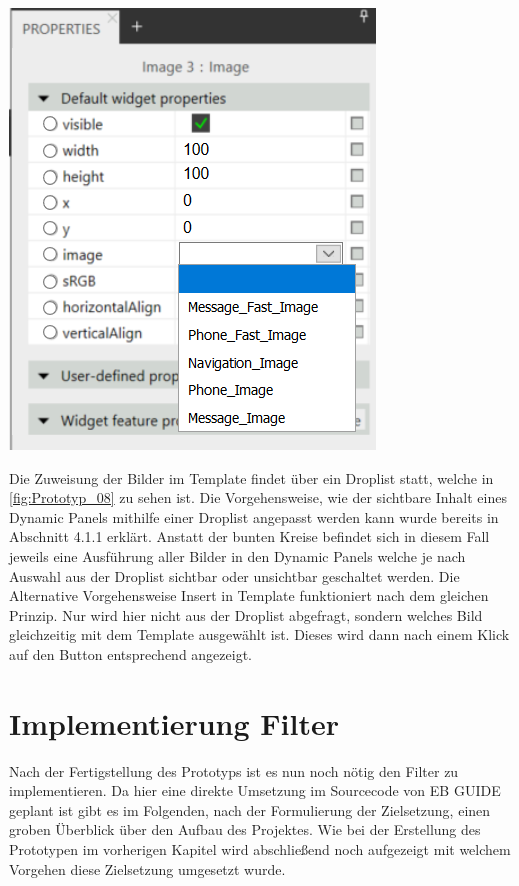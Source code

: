 \begin{center}
  \includegraphics[scale=0.6]{figures/Prototyp_08.PNG}
  \label{fig:Prototyp_08}
\end{center}

Die Zuweisung der Bilder im Template findet über ein Droplist statt, welche in \cref{fig:Prototyp_08} zu sehen ist.
Die Vorgehensweise, wie der sichtbare Inhalt eines Dynamic Panels mithilfe einer Droplist angepasst werden kann wurde bereits in Abschnitt 4.1.1 erklärt.
Anstatt der bunten Kreise befindet sich in diesem Fall jeweils eine Ausführung aller Bilder in den Dynamic Panels welche je nach Auswahl aus der Droplist sichtbar oder unsichtbar geschaltet werden.
Die Alternative Vorgehensweise \glqq Insert in Template\grqq{} funktioniert nach dem gleichen Prinzip.
Nur wird hier nicht aus der Droplist abgefragt, sondern welches Bild gleichzeitig mit dem Template ausgewählt ist.
Dieses wird dann nach einem Klick auf den Button entsprechend angezeigt.


\section {Implementierung Filter}
Nach der Fertigstellung des Prototyps ist es nun noch nötig den Filter zu implementieren.
Da hier eine direkte Umsetzung im Sourcecode von EB GUIDE geplant ist gibt es im Folgenden, nach der Formulierung der Zielsetzung,  einen groben Überblick über den Aufbau des Projektes.
Wie bei der Erstellung des Prototypen im vorherigen Kapitel wird abschließend noch aufgezeigt mit welchem Vorgehen diese Zielsetzung umgesetzt wurde.

